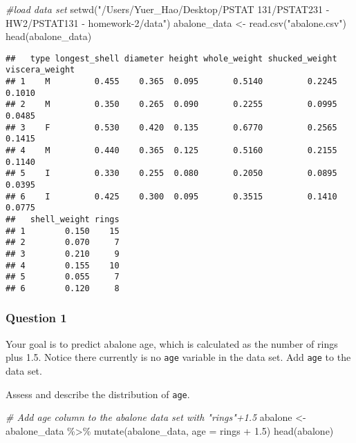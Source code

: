 \documentclass[
]{article}
\newenvironment{Shaded}{\begin{snugshade}}{\end{snugshade}}
\newcommand{\AttributeTok}[1]{\textcolor[rgb]{0.77,0.63,0.00}{#1}}
\newcommand{\CommentTok}[1]{\textcolor[rgb]{0.56,0.35,0.01}{\textit{#1}}}
\newcommand{\FloatTok}[1]{\textcolor[rgb]{0.00,0.00,0.81}{#1}}
\newcommand{\FunctionTok}[1]{\textcolor[rgb]{0.00,0.00,0.00}{#1}}
\newcommand{\NormalTok}[1]{#1}
\newcommand{\OtherTok}[1]{\textcolor[rgb]{0.56,0.35,0.01}{#1}}
\newcommand{\SpecialCharTok}[1]{\textcolor[rgb]{0.00,0.00,0.00}{#1}}
\newcommand{\StringTok}[1]{\textcolor[rgb]{0.31,0.60,0.02}{#1}}
\begin{document}
\begin{Shaded}
\begin{Highlighting}[]
\CommentTok{\#load data set}
\FunctionTok{setwd}\NormalTok{(}\StringTok{"/Users/Yuer\_Hao/Desktop/PSTAT 131/PSTAT231 {-} HW2/PSTAT131 {-} homework{-}2/data"}\NormalTok{)}
\NormalTok{abalone\_data }\OtherTok{\textless{}{-}} \FunctionTok{read.csv}\NormalTok{(}\StringTok{"abalone.csv"}\NormalTok{)}
\FunctionTok{head}\NormalTok{(abalone\_data)}
\end{Highlighting}
\end{Shaded}

\begin{verbatim}
##   type longest_shell diameter height whole_weight shucked_weight viscera_weight
## 1    M         0.455    0.365  0.095       0.5140         0.2245         0.1010
## 2    M         0.350    0.265  0.090       0.2255         0.0995         0.0485
## 3    F         0.530    0.420  0.135       0.6770         0.2565         0.1415
## 4    M         0.440    0.365  0.125       0.5160         0.2155         0.1140
## 5    I         0.330    0.255  0.080       0.2050         0.0895         0.0395
## 6    I         0.425    0.300  0.095       0.3515         0.1410         0.0775
##   shell_weight rings
## 1        0.150    15
## 2        0.070     7
## 3        0.210     9
## 4        0.155    10
## 5        0.055     7
## 6        0.120     8
\end{verbatim}

\hypertarget{question-1}{%
\subsubsection{Question 1}\label{question-1}}

Your goal is to predict abalone age, which is calculated as the number
of rings plus 1.5. Notice there currently is no \texttt{age} variable in
the data set. Add \texttt{age} to the data set.

Assess and describe the distribution of \texttt{age}.

\begin{Shaded}
\begin{Highlighting}[]
\CommentTok{\# Add age column to the abalone data set with "rings"+1.5}
\NormalTok{abalone }\OtherTok{\textless{}{-}}\NormalTok{ abalone\_data }\SpecialCharTok{\%\textgreater{}\%}
  \FunctionTok{mutate}\NormalTok{(abalone\_data, }\AttributeTok{age =}\NormalTok{ rings }\SpecialCharTok{+} \FloatTok{1.5}\NormalTok{) }
\FunctionTok{head}\NormalTok{(abalone)}
\end{Highlighting}
\end{Shaded}
\end{document}
